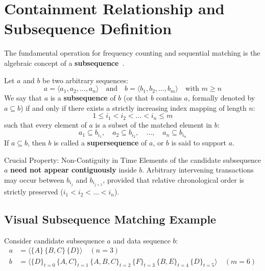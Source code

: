 \section{Containment Relationship and Subsequence Definition}
\label{sec:dm-seq-subsequence}

The fundamental operation for frequency counting and sequential matching is the algebraic concept of a \textbf{subsequence}~\cite{tan2018, agrawal1995}.

\begin{definition}
Let $a$ and $b$ be two arbitrary sequences:
\begin{equation}
a = \langle a_1, a_2, \dots, a_n \rangle \quad \text{and} \quad b = \langle b_1, b_2, \dots, b_m \rangle \quad \text{with } m \ge n
\end{equation}
We say that $a$ is a \textbf{subsequence} of $b$ (or that $b$ contains $a$, formally denoted by $a \subseteq b$) if and only if there exists a strictly increasing index mapping of length $n$:
\begin{equation}
\label{eq:seq-subsequence-indices-en}
1 \le i_1 < i_2 < \dots < i_n \le m
\end{equation}
such that every element of $a$ is a subset of the matched element in $b$:
\begin{equation}
\label{eq:seq-subsequence-inclusion-en}
a_1 \subseteq b_{i_1}, \quad a_2 \subseteq b_{i_2}, \quad \dots, \quad a_n \subseteq b_{i_n}
\end{equation}
If $a \subseteq b$, then $b$ is called a \textbf{supersequence} of $a$, or $b$ is said to support $a$.
\end{definition}

\begin{alertblock}{Crucial Property: Non-Contiguity in Time}
    Elements of the candidate subsequence $a$ \textbf{need not appear contiguously} inside $b$. Arbitrary intervening transactions may occur between $b_{i_j}$ and $b_{i_{j+1}}$, provided that relative chronological order is strictly preserved ($i_1 < i_2 < \dots < i_n$).
\end{alertblock}

\subsection{Visual Subsequence Matching Example}
Consider candidate subsequence $a$ and data sequence $b$:
\begin{align}
a &= \langle \{A\} \, \{B, C\} \, \{D\} \rangle \quad (n = 3) \\
b &= \langle \{D\}_{t=0} \, \{A, C\}_{t=1} \, \{A, B, C\}_{t=2} \, \{F\}_{t=3} \, \{B, E\}_{t=4} \, \{D\}_{t=5} \rangle \quad (m = 6)
\end{align}


